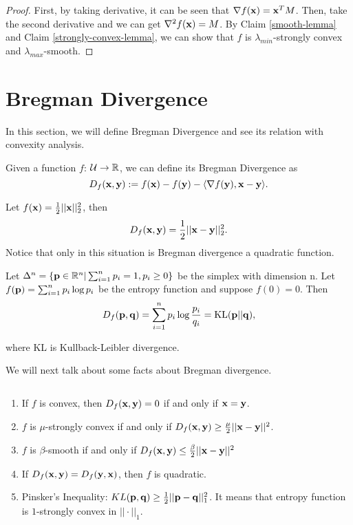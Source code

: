 \documentclass[../main.tex]{subfiles}
\begin{document}
\begin{proof}
	
	First, by taking derivative, it can be seen that $\nabla f(\mathbf{x}) = \mathbf{x}^T M$. Then, take the second derivative and we can get $\nabla^2 f(\mathbf{x}) = M$. By Claim \ref{smooth-lemma} and Claim \ref{strongly-convex-lemma}, we can show that $f$ is $\lambda_{min}$-strongly convex and $\lambda_{max}$-smooth.
\end{proof}

\section{Bregman Divergence}
In this section, we will define Bregman Divergence and see its relation with convexity analysis.

\begin{definition}
	Given a function $f$: $\mathcal{U} \to \mathbb{R}$, we can define its Bregman Divergence as
	\begin{equation}
		D_f(\mathbf{x}, \mathbf{y}) := f(\mathbf{x}) - f(\mathbf{y}) - \langle \nabla f(\mathbf{y}), \mathbf{x} - \mathbf{y} \rangle.
	\end{equation}
\end{definition}

\begin{example}
		Let $f(\mathbf{x}) = \frac{1}{2} ||\mathbf{x}||_2^2$, then
		\begin{equation*}
		D_f(\mathbf{x}, \mathbf{y}) = \frac{1}{2} ||\mathbf{x} - \mathbf{y}||_2^2.
		\end{equation*}
		Notice that only in this situation is Bregman divergence a quadratic function.
\end{example}

\begin{example}
	Let $\Delta^n = \{\mathbf{p} \in \mathbb{R}^n| \sum_{i=1}^n p_i = 1, p_i \geq 0\}$ be the simplex with dimension n. Let $f(\mathbf{p}) = \sum_{i=1}^n p_i\log p_i$ be the entropy function and suppose $f(0) = 0$. Then
	\begin{equation*}
	D_f(\mathbf{p},\mathbf{q}) = \sum\limits_{i=1}^n p_i\log \frac{p_i}{q_i} = \textmd{KL}(\mathbf{p} || \mathbf{q}),
	\end{equation*}
	
	where KL is Kullback-Leibler divergence.
\end{example}

We will next talk about some facts about Bregman divergence.

\begin{fact} $ $
	\begin{enumerate}
		\item If $f$ is convex, then $D_f (\mathbf{x}, \mathbf{y}) = 0$ if and only if $\mathbf{x}=\mathbf{y}$.
		\item $f$ is $\mu$-strongly convex if and only if $D_f(\mathbf{x}, \mathbf{y}) \geq \frac{\mu}{2} ||\mathbf{x}-\mathbf{y}||^2$.
		\item $f$ is $\beta$-smooth if and only if $D_f(\mathbf{x}, \mathbf{y}) \leq \frac{\beta}{2} ||\mathbf{x} - \mathbf{y}||^2$
		\item If $D_f(\mathbf{x}, \mathbf{y}) = D_f(\mathbf{y}, \mathbf{x})$, then $f$ is quadratic.
		\item Pinsker's Inequality: $KL(\mathbf{p}, \mathbf{q}) \geq \frac{1}{2} ||\mathbf{p} - \mathbf{q}||_1^2$. It means that entropy function is $1$-strongly convex in $||\cdot||_1$.
	\end{enumerate}
\end{fact}
\end{document}
